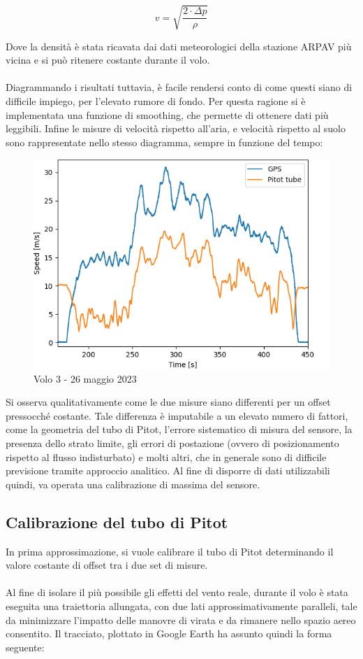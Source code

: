 \documentclass[12pt]{article}
\begin{document}
\begin{equation}
v = \sqrt{\frac{2 \cdot \Delta p}{\rho}}
\end{equation}

\noindent
Dove la densità è stata ricavata dai dati meteorologici della stazione ARPAV più vicina \cite{arpav} e si può ritenere costante durante il volo.
\\\\
Diagrammando i risultati tuttavia, è facile rendersi conto di come questi siano di difficile impiego, per l'elevato rumore di fondo. Per questa ragione si è implementata una funzione di smoothing, che permette di ottenere dati più leggibili. Infine le misure di velocità rispetto all'aria, e velocità rispetto al suolo sono rappresentate nello stesso diagramma, sempre in funzione del tempo:

\begin{figure}[H]
	\centering
	\includegraphics[width=12cm]{img/pitot-offset-3}
	\captionsetup{labelformat=empty}
	\caption{Volo 3 - 26 maggio 2023}
\end{figure}

\noindent
Si osserva qualitativamente come le due misure siano differenti per un offset pressocché costante. Tale differenza è imputabile a un elevato numero di fattori, come la geometria del tubo di Pitot, l'errore sistematico di misura del sensore, la presenza dello strato limite, gli errori di postazione (ovvero di posizionamento rispetto al flusso indisturbato) e molti altri, che in generale sono di difficile previsione tramite approccio analitico. Al fine di disporre di dati utilizzabili quindi, va operata una calibrazione di massima del sensore.

\subsection{Calibrazione del tubo di Pitot}
In prima approssimazione, si vuole calibrare il tubo di Pitot determinando il valore costante di offset tra i due set di misure.
\\\\
Al fine di isolare il più possibile gli effetti del vento reale, durante il volo è stata eseguita una traiettoria allungata, con due lati approssimativamente paralleli, tale da minimizzare l'impatto delle manovre di virata e da rimanere nello spazio aereo consentito. Il tracciato, plottato in Google Earth ha assunto quindi la forma seguente:
\end{document}
